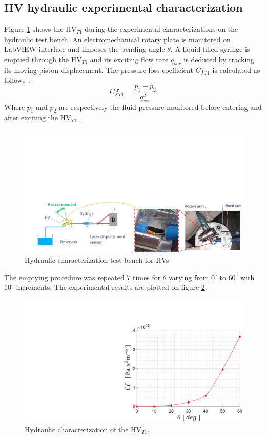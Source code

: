 \documentclass[3p,twocolumn,preprint]{elsarticle}
\begin{document}
	\subsection{HV hydraulic experimental characterization}	
	\label{subsec:HV hydraulic test bench presentation}
Figure \ref{fig:essais_hydraulique_VH} shows the HV$_{T1}$ during the experimental characterizations on the hydraulic test bench. An electromechanical rotary plate is monitored on LabVIEW interface and imposes the bending angle $\theta$. A liquid filled syringe is emptied through the HV$_{T1}$ and its exciting flow rate $q_{ser}$ is deduced by tracking its moving piston displacement. The pressure loss coefficient $Cf_{T1}$ is calculated as \mbox{follows :}
\begin{equation}
	Cf_{T1} = \dfrac{p_1-p_2}{q_{ser}^2}
\end{equation}
Where $p_1$ and $p_2$ are respectively the fluid pressure monitored before entering and after exciting the HV$_{T1}$.
\begin{figure}[!htb]
\begin{center}
	\captionsetup{justification=centering} 
	\includegraphics[trim={2cm 0cm 0cm 11cm},clip,width=.8\textwidth]{figures/essais_hydraulique_VH.pdf}
	\caption{Hydraulic characterization test bench for HVs}
	\label{fig:essais_hydraulique_VH}
\end{center}	
\end{figure}    
The emptying procedure was repeated 7 times for $\theta$ varying from $0^{\circ}$ to $60^{\circ}$ with $10^{\circ}$ increments. The experimental results are plotted on figure \ref{fig:resultats_essais_hydraulique_VH_D1mm}.
\begin{figure}[!htbp]
\centering
	\captionsetup{justification=centering}
	\includegraphics[trim={15.5cm 0cm 0cm 3.6cm},clip,width=0.6\linewidth]{figures/resultats_essais_hydraulique_VH_D1mm.pdf}
	\caption{Hydraulic characterization of the HV$_{T1}$.}
	\label{fig:resultats_essais_hydraulique_VH_D1mm}
\end{figure}
\end{document}
